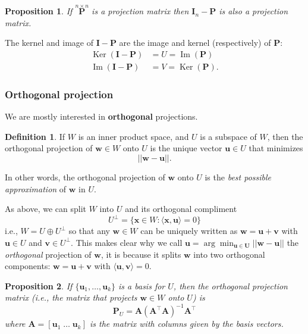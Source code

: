 \documentclass[
]{book}
\newtheorem{proposition}{Proposition}[chapter]
\theoremstyle{definition}
\newtheorem{definition}{Definition}[chapter]
\theoremstyle{definition}
\theoremstyle{definition}
\theoremstyle{definition}
\theoremstyle{remark}
\begin{document}
\begin{proposition}
\protect\hypertarget{prp:projIP}{}\label{prp:projIP}If \(\stackrel{n \times n}{\mathbf P}\) is a projection matrix then \({\mathbf I}_n - \mathbf P\) is also
a projection matrix.
\end{proposition}

The kernel and image of \(\mathbf I-\mathbf P\) are the image and kernel (respectively) of \(\mathbf P\):
\begin{align*}
\operatorname{Ker}(\mathbf I-\mathbf P) &= U=\operatorname{Im}(\mathbf P)\\
\operatorname{Im}(\mathbf I-\mathbf P) &= V=\operatorname{Ker}(\mathbf P).
\end{align*}

\subsubsection{Orthogonal projection}\label{orthogproj}

We are mostly interested in \textbf{orthogonal} projections.

\begin{definition}
\protect\hypertarget{def:orthogproj}{}\label{def:orthogproj}If \(W\) is an inner product space, and \(U\) is a subspace of \(W\), then the orthogonal projection of \(\mathbf w\in W\) onto \(U\) is the unique vector \(\mathbf u\in U\) that minimizes
\[||\mathbf w-\mathbf u||.\]
\end{definition}

In other words, the orthogonal projection of \(\mathbf w\) onto \(U\) is the \emph{best possible approximation} of \(\mathbf w\) in \(U\).

As above, we can split \(W\) into \(U\) and its orthogonal compliment
\[U^\perp = \{\mathbf x\in W: \langle \mathbf x,\mathbf u\rangle = 0\}\]
i.e., \(W=U \oplus U^\perp\) so that any \(\mathbf w\in W\) can be uniquely written as
\(\mathbf w=\mathbf u+\mathbf v\) with \(\mathbf u\in U\) and \(\mathbf v\in U^\perp\). This makes clear why we call \(\mathbf u= \arg \min_{\mathbf u\in \mathbf U} ||\mathbf w-\mathbf u||\) the \emph{orthogonal} projection of \(\mathbf w\), it is because it splits \(\mathbf w\) into two orthogonal components: \(\mathbf w= \mathbf u+\mathbf v\) with \(\langle \mathbf u, \mathbf v\rangle=0\).

\begin{proposition}
\protect\hypertarget{prp:orthogprojection}{}\label{prp:orthogprojection}If \(\{\mathbf u_1, \ldots, \mathbf u_k\}\) is a basis for \(U\), then the orthogonal projection matrix (i.e., the matrix that projects \(\mathbf w\in W\) onto \(U\)) is
\[\mathbf P_U = \mathbf A(\mathbf A^\top \mathbf A)^{-1}\mathbf A^\top\] where
\(\mathbf A=[\mathbf u_1\; \ldots\; \mathbf u_k]\) is the matrix with columns given by the basis vectors.
\end{proposition}
\end{document}

